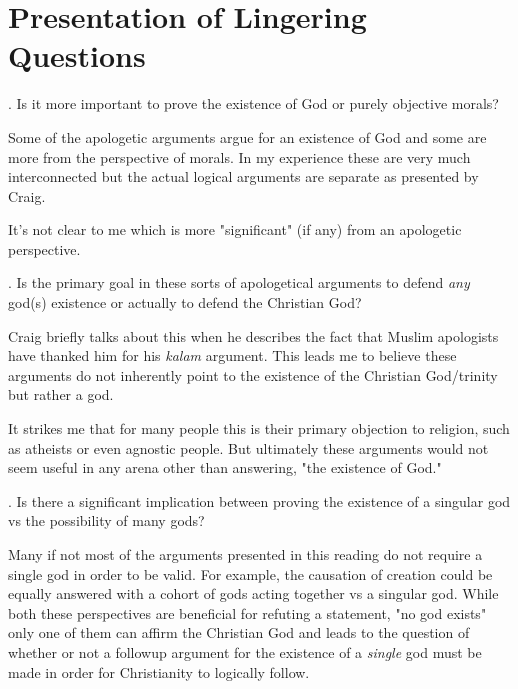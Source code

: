 \documentclass[12pt]{turabian-researchpaper}
\begin{document}
\section{Presentation of Lingering Questions}

. Is it more important to prove the existence of God or purely objective morals?

Some of the apologetic arguments argue for an existence of God and some are more from the perspective of morals. In my experience these are very much interconnected but the actual logical arguments are separate as presented by Craig.

It's not clear to me which is more "significant" (if any) from an apologetic perspective.

. Is the primary goal in these sorts of apologetical arguments to defend \textit{any} god(s) existence or actually to defend the Christian God?

Craig briefly talks about this when he describes the fact that Muslim apologists have thanked him for his \textit{kalam} argument\autocite[pg.193]{craig2008reasonable}. This leads me to believe these arguments do not inherently point to the existence of the Christian God/trinity but rather a god. 

It strikes me that for many people this is their primary objection to religion, such as atheists or even agnostic people. But ultimately these arguments would not seem useful in any arena other than answering, "the existence of God."

. Is there a significant implication between proving the existence of a singular god vs the possibility of many gods?

Many if not most of the arguments presented in this reading do not require a single god in order to be valid. For example, the causation of creation could be equally answered with a cohort of gods acting together vs a singular god. While both these perspectives are beneficial for refuting a statement, "no god exists" only one of them can affirm the Christian God and leads to the question of whether or not a followup argument for the existence of a \textit{single} god must be made in order for Christianity to logically follow.

\newpage
\printbibliography
\end{document}
